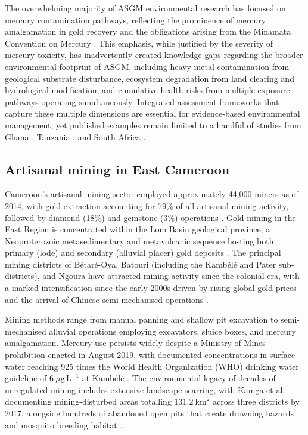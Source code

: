 \documentclass[preprint,12pt,authoryear]{elsarticle}
\begin{document}
The overwhelming majority of ASGM environmental research has focused on mercury contamination pathways, reflecting the prominence of mercury amalgamation in gold recovery and the obligations arising from the Minamata Convention on Mercury \citep{UNEP2020}. This emphasis, while justified by the severity of mercury toxicity, has inadvertently created knowledge gaps regarding the broader environmental footprint of ASGM, including heavy metal contamination from geological substrate disturbance, ecosystem degradation from land clearing and hydrological modification, and cumulative health risks from multiple exposure pathways operating simultaneously. Integrated assessment frameworks that capture these multiple dimensions are essential for evidence-based environmental management, yet published examples remain limited to a handful of studies from Ghana \citep{Basu2015, Hilson2002}, Tanzania \citep{Malisa2009}, and South Africa \citep{Kamunda2016}.

\subsection{Artisanal mining in East Cameroon}

Cameroon's artisanal mining sector employed approximately 44,000 miners as of 2014, with gold extraction accounting for 79\% of all artisanal mining activity, followed by diamond (18\%) and gemstone (3\%) operations \citep{CAPAM2014}. Gold mining in the East Region is concentrated within the Lom Basin geological province, a Neoproterozoic metasedimentary and metavolcanic sequence hosting both primary (lode) and secondary (alluvial placer) gold deposits \citep{Mimba2018}. The principal mining districts of B\'{e}tar\'{e}-Oya, Batouri (including the Kamb\'{e}l\'{e} and Pater sub-districts), and Ngoura have attracted mining activity since the colonial era, with a marked intensification since the early 2000s driven by rising global gold prices and the arrival of Chinese semi-mechanised operations \citep{Weng2022}.

Mining methods range from manual panning and shallow pit excavation to semi-mechanised alluvial operations employing excavators, sluice boxes, and mercury amalgamation. Mercury use persists widely despite a Ministry of Mines prohibition enacted in August 2019, with documented concentrations in surface water reaching 925 times the World Health Organization (WHO) drinking water guideline of $6~\mu\text{g}\,\text{L}^{-1}$ at Kamb\'{e}l\'{e} \citep{Fonshiynwa2024}. The environmental legacy of decades of unregulated mining includes extensive landscape scarring, with Kamga et al. \citep{Kamga2020} documenting mining-disturbed areas totalling $131.2~\text{km}^{2}$ across three districts by 2017, alongside hundreds of abandoned open pits that create drowning hazards and mosquito breeding habitat \citep{FODER2022}.
\end{document}

